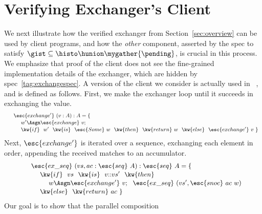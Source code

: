 \section{Verifying Exchanger's Client}
\label{sec:cal}
\newcommand{\ts}{{ts}}
\newcommand{\vvs}{{vs}}
\newcommand{\acc}{{ac}}
\newcommand{\ws}{{ws}}
\newcommand{\sorted}[1]{\mathsf{sorted}\ #1}

We next illustrate how the verified exchanger from
Section~\ref{sec:overview} can be used by client programs, and how the
\emph{other} component, asserted by the spec to satisfy $\gist
\subseteq \histo \hunion \mygather{\pending}$, is crucial in this
process.
%
We emphasize that proof of the client does not see the fine-grained
implementation details of the exchanger, which are hidden by
spec~\eqref{tag:exchangespec}.
%
A version of the client we consider is actually used in
~\cite{ExchangerClass}, and is defined as
follows. First, we make the exchanger loop until it succeeds in
exchanging the value.
%
\vspace{-5pt}
\[
\vspace{-5pt}
{\small{
\begin{array}{rl}
& \esc{exchange'}~(v : A) : A = \{\\[1pt]
&  ~~~~ w' \Asgn \esc{exchange}~v;\\[1pt]
&  ~~~~
  \kw{if}~~w'~~\kw{is}~~\esc{Some}~w~~\kw{then}~~\kw{return}~w~~\kw{else}~~\esc{exchange'}~v~\}
\end{array}
}}
\]
%
Next, $\esc{exchange'}$ is iterated over a sequence, exchanging each
element in order, appending the received matches to an accumulator. 
%
\vspace{-5pt}
\[
\vspace{-5pt}
{\small{
\begin{array}{rl}
& \esc{ex\_seq}~(\vvs, \acc : \esc{seq}~A) : \esc{seq}~A = \{\\[1pt]
& ~~~~ \kw{if}~~\vvs~~\kw{is}~~v{::}\vvs'~~\kw{then}\\[1pt]
& ~~~~ ~~~~ w \Asgn \esc{exchange'}~v;~~\esc{ex\_seq}~(\vvs', \esc{snoc}~\acc~w)\\[1pt]
& ~~~~ \kw{else}~~\kw{return}~\acc~\}
\end{array}
}}
\]
%
Our goal is to show
that the parallel composition
